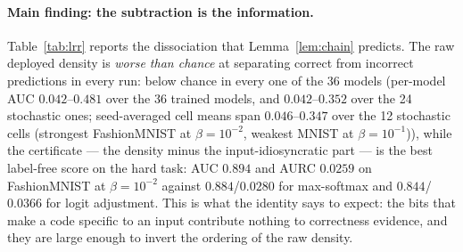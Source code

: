 \documentclass[11pt]{article}
\begin{document}
\paragraph{Main finding: the subtraction is the information.} Table~\ref{tab:lrr} reports the
dissociation that Lemma~\ref{lem:chain} predicts. The raw deployed density is \emph{worse than
chance} at separating correct from incorrect predictions in every run: below chance in every one of the 36 models (per-model AUC
$0.042$--$0.481$ over the 36 trained models, and $0.042$--$0.352$ over the 24 stochastic ones;
seed-averaged cell means span $0.046$--$0.347$ over the
12 stochastic cells (strongest FashionMNIST at $\beta=10^{-2}$, weakest MNIST at
$\beta=10^{-1}$)), while the certificate --- the density minus the input-idiosyncratic part --- is
the best label-free score on the hard task: AUC $0.894$ and AURC $0.0259$ on FashionMNIST at
$\beta=10^{-2}$ against $0.884$/$0.0280$ for max-softmax and $0.844$/$0.0366$ for logit
adjustment. This is what the identity says to expect: the bits that make a code specific to an
input contribute nothing to correctness evidence, and they are large enough to invert the
ordering of the raw density.
\end{document}
